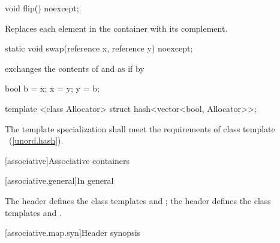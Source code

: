 %
%
\begin{itemdecl}
void flip() noexcept;
\end{itemdecl}

\begin{itemdescr}
\pnum
\effects Replaces each element in the container with its complement.
\end{itemdescr}

%
%
\begin{itemdecl}
static void swap(reference x, reference y) noexcept;
\end{itemdecl}

\begin{itemdescr}
\pnum
\effects exchanges the contents of  and  as if by

\begin{codeblock}
bool b = x;
x = y;
y = b;
\end{codeblock}

\end{itemdescr}

\begin{itemdecl}
template <class Allocator> struct hash<vector<bool, Allocator>>;
\end{itemdecl}

\begin{itemdescr}
\pnum
The template specialization shall meet the requirements of class template
~(\ref{unord.hash}).
\end{itemdescr}

[associative]{Associative containers}

[associative.general]{In general}

\pnum
The header  defines the class templates  and
; the header  defines the class templates
 and .

[associative.map.syn]{Header  synopsis}

